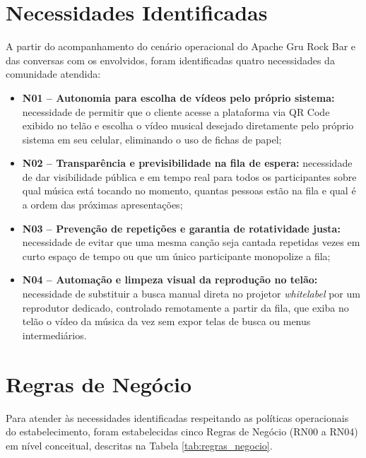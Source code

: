 \section{Necessidades Identificadas}

A partir do acompanhamento do cenário operacional do Apache Gru Rock Bar e das conversas com os envolvidos, foram identificadas quatro necessidades da comunidade atendida:

\begin{itemize}
  \item \textbf{N01 -- Autonomia para escolha de vídeos pelo próprio sistema:} necessidade de permitir que o cliente acesse a plataforma via QR Code exibido no telão e escolha o vídeo musical desejado diretamente pelo próprio sistema em seu celular, eliminando o uso de fichas de papel;
  \item \textbf{N02 -- Transparência e previsibilidade na fila de espera:} necessidade de dar visibilidade pública e em tempo real para todos os participantes sobre qual música está tocando no momento, quantas pessoas estão na fila e qual é a ordem das próximas apresentações;
  \item \textbf{N03 -- Prevenção de repetições e garantia de rotatividade justa:} necessidade de evitar que uma mesma canção seja cantada repetidas vezes em curto espaço de tempo ou que um único participante monopolize a fila;
  \item \textbf{N04 -- Automação e limpeza visual da reprodução no telão:} necessidade de substituir a busca manual direta no projetor \textit{whitelabel} por um reprodutor dedicado, controlado remotamente a partir da fila, que exiba no telão o vídeo da música da vez sem expor telas de busca ou menus intermediários.
\end{itemize}

\section{Regras de Negócio}

Para atender às necessidades identificadas respeitando as políticas operacionais do estabelecimento, foram estabelecidas cinco Regras de Negócio (RN00 a RN04) em nível conceitual, descritas na Tabela \ref{tab:regras_negocio}.


